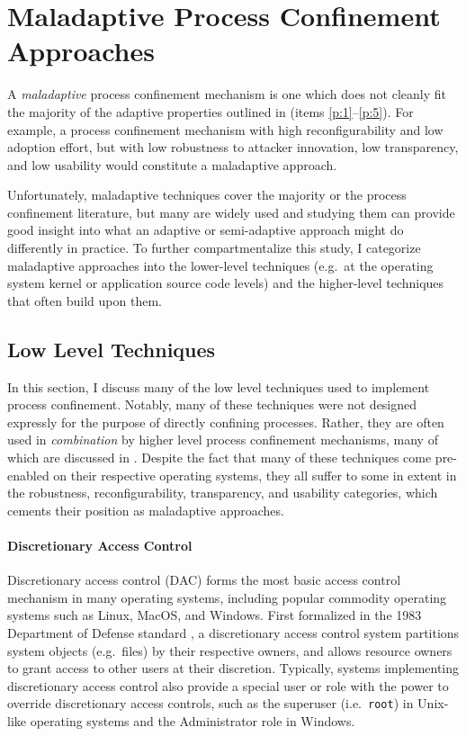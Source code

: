 \documentclass[dvipsnames, 12pt]{article}
\begin{document}
\section{Maladaptive Process Confinement Approaches}
\label{sec:maladaptive}

A \textit{maladaptive} process confinement mechanism is one which does not
cleanly fit the majority of the adaptive properties outlined in
 (items \ref{p:1}--\ref{p:5}). For example, a process
confinement mechanism with high reconfigurability and low adoption effort, but
with low robustness to attacker innovation, low transparency, and low usability
would constitute a maladaptive approach.

Unfortunately, maladaptive techniques cover the majority or the process
confinement literature, but many are widely used and studying them can provide
good insight into what an adaptive or semi-adaptive approach might do
differently in practice. To further compartmentalize this study, I categorize
maladaptive approaches into the lower-level techniques (e.g.~at the operating
system kernel or application source code levels) and the higher-level techniques
that often build upon them.

\subsection{Low Level Techniques}
\label{sec:low-level}

In this section, I discuss many of the low level techniques used to implement
process confinement. Notably, many of these techniques were not designed
expressly for the purpose of directly confining processes. Rather, they are
often used in \textit{combination} by higher level process confinement
mechanisms, many of which are discussed in . Despite the
fact that many of these techniques come pre-enabled on their respective operating
systems, they all suffer to some in extent in the robustness, reconfigurability,
transparency, and usability categories, which cements their position as
maladaptive approaches.

\paragraph*{Discretionary Access Control}
Discretionary access control (DAC) forms the most basic access control mechanism
in many operating systems, including popular commodity operating systems such as
Linux, MacOS, and Windows.  First formalized in the 1983 Department of Defense
standard \cite{orange_book}, a discretionary access control system partitions
system objects (e.g.~files) by their respective owners, and allows resource
owners to grant access to other users at their discretion.  Typically, systems
implementing discretionary access control also provide a special user or role
with the power to override discretionary access controls, such as the superuser
(i.e.~\texttt{root}) in Unix-like operating systems and the Administrator role
in Windows.
\end{document}
